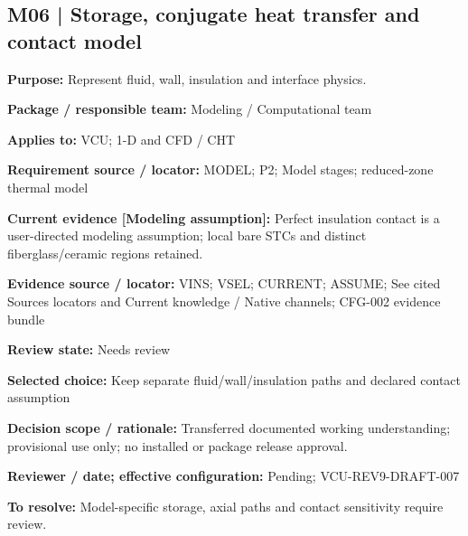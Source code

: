 \documentclass[11pt]{article}
\begin{document}
\par\noindent\begin{minipage}{\textwidth}\small\setlength{\parskip}{2pt}
\subsection*{M06 | Storage, conjugate heat transfer and contact model}
\textbf{Purpose:} Represent fluid, wall, insulation and interface physics.\par
\textbf{Package / responsible team:} Modeling / Computational team\par
\textbf{Applies to:} VCU; 1-D and CFD / CHT\par
\textbf{Requirement source / locator:} MODEL; P2; Model stages; reduced-zone thermal model\par
\textbf{Current evidence [Modeling assumption]:} Perfect insulation contact is a user-directed modeling assumption; local bare STCs and distinct fiberglass/ceramic regions retained.\par
\textbf{Evidence source / locator:} VINS; VSEL; CURRENT; ASSUME; See cited Sources locators and Current knowledge / Native channels; CFG-002 evidence bundle\par
\textbf{Review state:} Needs review\par
\textbf{Selected choice:} Keep separate fluid/wall/insulation paths and declared contact assumption\par
\textbf{Decision scope / rationale:} Transferred documented working understanding; provisional use only; no installed or package release approval.\par
\textbf{Reviewer / date; effective configuration:} Pending; VCU-REV9-DRAFT-007\par
\textbf{To resolve:} Model-specific storage, axial paths and contact sensitivity require review.\par
\end{minipage}\par\vspace{5pt}
\end{document}
